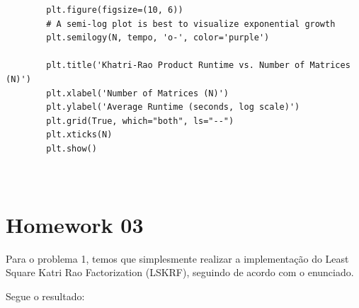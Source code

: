 \documentclass[a4paper, 12pt]{article}
\let\oldsection\section
\renewcommand{\section}[1]{{\vspace{20pt}\oldsection*{#1}\vspace{-10pt}}}
\begin{document}
\begin{lstlisting}
		plt.figure(figsize=(10, 6))
		# A semi-log plot is best to visualize exponential growth
		plt.semilogy(N, tempo, 'o-', color='purple')
		
		plt.title('Khatri-Rao Product Runtime vs. Number of Matrices (N)')
		plt.xlabel('Number of Matrices (N)')
		plt.ylabel('Average Runtime (seconds, log scale)')
		plt.grid(True, which="both", ls="--")
		plt.xticks(N)
		plt.show()
		
		
	\end{lstlisting}
	
	\section{Homework 03}
	
	Para o problema 1, temos que simplesmente realizar a implementação do Least Square Katri Rao Factorization (LSKRF), seguindo de acordo com o enunciado.
	
	Segue o resultado: 
	
	
	
	
	
\end{document}
